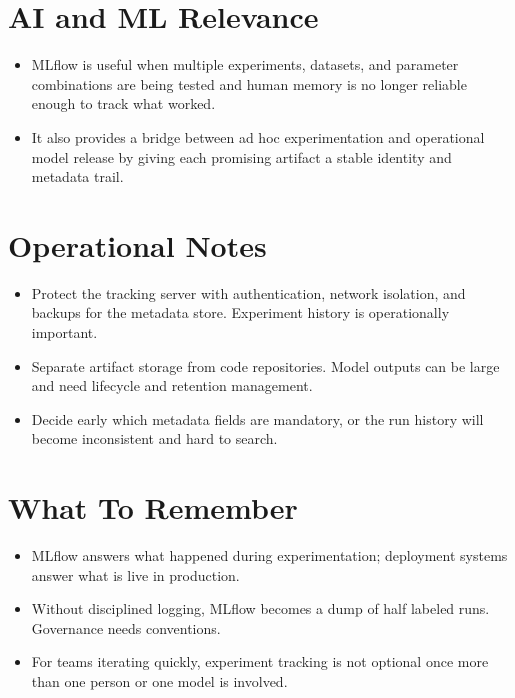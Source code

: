 \documentclass[10pt,twocolumn]{article}
\begin{document}
\section*{AI and ML Relevance}
\begin{itemize}
\item MLflow is useful when multiple experiments, datasets, and parameter combinations are being tested and human memory is no longer reliable enough to track what worked.
\item It also provides a bridge between ad hoc experimentation and operational model release by giving each promising artifact a stable identity and metadata trail.
\end{itemize}

\section*{Operational Notes}
\begin{itemize}
\item Protect the tracking server with authentication, network isolation, and backups for the metadata store. Experiment history is operationally important.
\item Separate artifact storage from code repositories. Model outputs can be large and need lifecycle and retention management.
\item Decide early which metadata fields are mandatory, or the run history will become inconsistent and hard to search.
\end{itemize}

\section*{What To Remember}
\begin{itemize}
\item MLflow answers what happened during experimentation; deployment systems answer what is live in production.
\item Without disciplined logging, MLflow becomes a dump of half labeled runs. Governance needs conventions.
\item For teams iterating quickly, experiment tracking is not optional once more than one person or one model is involved.
\end{itemize}
\end{document}
